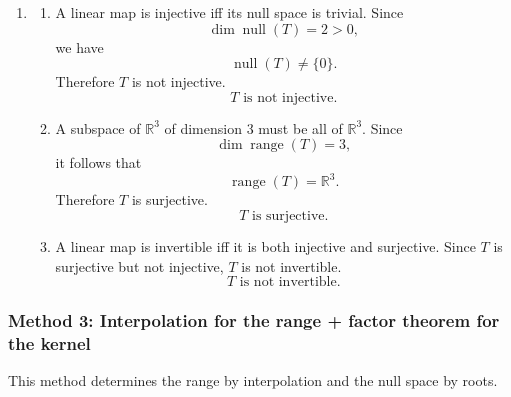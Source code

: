 \documentclass[12pt]{article}
\begin{document}
\begin{enumerate}[label=(\alph*)]
Since
\[
\dim P_4(\mathbb{R})=5,
\]
rank--nullity gives
\[
\dim\operatorname{null}(T)=5-3=2.
\]

To provide a basis for $\operatorname{range}(T)$, take the pivot columns of the original matrix. These are the first three columns, so a basis for $\operatorname{range}(T)$ is
\[
\{(1,1,1),(0,1,2),(0,1,4)\}.
\]
Thus
\[
\operatorname{range}(T)=\operatorname{span}\{(1,1,1),(0,1,2),(0,1,4)\},
\]
and
\[
\boxed{\dim(\operatorname{null}(T))=2,\qquad \dim(\operatorname{range}(T))=3.}
\]

\item
\begin{enumerate}[label=(\roman*)]
\item A linear map is injective iff its null space is trivial. Since
\[
\dim\operatorname{null}(T)=2>0,
\]
we have
\[
\operatorname{null}(T)\neq \{0\}.
\]
Therefore $T$ is not injective.
\[
\boxed{\,T\text{ is not injective.}\,}
\]

\item A subspace of $\mathbb{R}^3$ of dimension $3$ must be all of $\mathbb{R}^3$. Since
\[
\dim\operatorname{range}(T)=3,
\]
it follows that
\[
\operatorname{range}(T)=\mathbb{R}^3.
\]
Therefore $T$ is surjective.
\[
\boxed{\,T\text{ is surjective.}\,}
\]

\item A linear map is invertible iff it is both injective and surjective. Since $T$ is surjective but not injective, $T$ is not invertible.
\[
\boxed{\,T\text{ is not invertible.}\,}
\]
\end{enumerate}
\end{enumerate}

\newpage
\subsubsection{Method 3: Interpolation for the range + factor theorem for the kernel}
This method determines the range by interpolation and the null space by roots.
\end{document}
